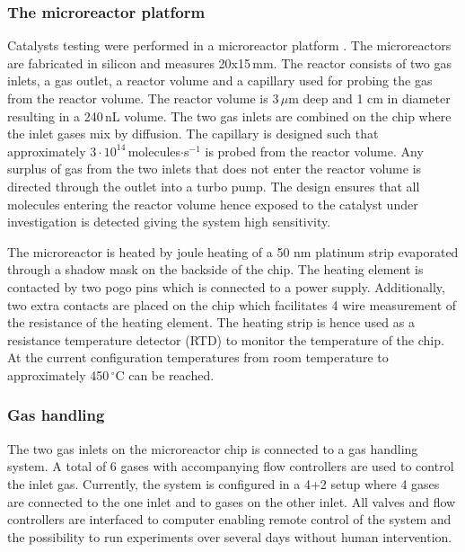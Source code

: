 \documentclass[12pt]{article}
\begin{document}
\subsubsection{The microreactor platform}
Catalysts testing were performed in a microreactor platform \cite{Henriksen2009}. The microreactors are fabricated in silicon and measures 20x15\,mm. The reactor consists of two gas inlets, a gas outlet, a reactor volume and a capillary used for probing the gas from the reactor volume. The reactor volume is 3\,$\mu$m deep and 1 cm in diameter resulting in a 240\,nL volume. The two gas inlets are combined on the chip where the inlet gases mix by diffusion. The capillary is designed such that approximately $3\cdot10^{14}$\,molecules$\cdot$s$^{-1}$ is probed from the reactor volume. Any surplus of gas from the two inlets that does not enter the reactor volume is directed through the outlet into a turbo pump. The design ensures that all molecules entering the reactor volume hence exposed to the catalyst under investigation is detected giving the system high sensitivity.

The microreactor is heated by joule heating of a 50 nm platinum strip evaporated through a shadow mask on the backside of the chip. The heating element is contacted by two pogo pins which is connected to a power supply. Additionally, two extra contacts are placed on the chip which facilitates 4 wire measurement of the resistance of the heating element. The heating strip is hence used as a resistance temperature detector (RTD) to monitor the temperature of the chip. At the current configuration temperatures from room temperature to approximately 450\,$^{\circ}$C can be reached.


\subsubsection{Gas handling}
The two gas inlets on the microreactor chip is connected to a gas handling system. A total of 6 gases with accompanying flow controllers are used to control the inlet gas. Currently, the system is configured in a 4+2 setup where 4 gases are connected to the one inlet and to gases on the other inlet. All valves and flow controllers are interfaced to computer enabling remote control of the system and the possibility to run experiments over several days without human intervention.
\end{document}
